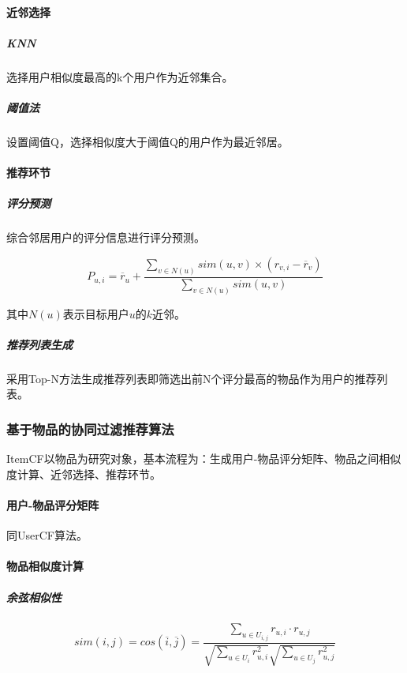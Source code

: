 \documentclass{upctrans}
\begin{document}
\paragraph{近邻选择}

\subparagraph{KNN} 

选择用户相似度最高的k个用户作为近邻集合。

\subparagraph{阈值法}

设置阈值Q，选择相似度大于阈值Q的用户作为最近邻居。

\paragraph{推荐环节}
\subparagraph{评分预测}

综合邻居用户的评分信息进行评分预测。

\begin{equation*}
    P_{u,i}=\overline{r}_u+
    \frac{
        \sum\limits_{v\in{N(u)}}sim(u,v)\times (r_{v,i}-\overline{r}_v)
    }{
        \sum\limits_{v\in{N(u)}}sim(u,v)
    }
\end{equation*}

其中$N(u)$表示目标用户$u$的$k$近邻。

\subparagraph{推荐列表生成}

采用Top-N方法生成推荐列表即筛选出前N个评分最高的物品作为用户的推荐列表。

\subsubsection{基于物品的协同过滤推荐算法}

ItemCF以物品为研究对象，基本流程为：生成用户-物品评分矩阵、物品之间相似度计算、近邻选择、推荐环节。

\paragraph{用户-物品评分矩阵}

同UserCF算法。

\paragraph{物品相似度计算}
\subparagraph{余弦相似性}

\begin{equation*}
    sim(i,j)
    =cos(\overline{i},\overline{j})
    =\frac{\sum\limits_{u\in{U_{i,j}}}r_{u,i}\cdot r_{u,j}}{\sqrt{\sum\limits_{u\in{U_i}}r_{u,i}^2}\sqrt{\sum\limits_{u\in{U_j}}r_{u,j}^2}}
\end{equation*}
\end{document}
